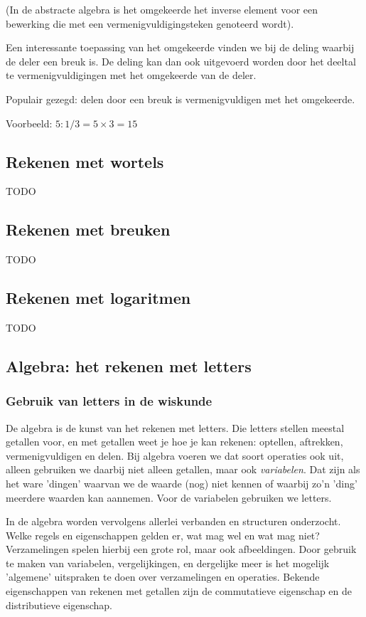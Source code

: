 \noindent (In de abstracte algebra is het omgekeerde het inverse element
voor een bewerking die met een vermenigvuldigingsteken genoteerd wordt).

\medskip{}


\noindent Een interessante toepassing van het omgekeerde vinden we
bij de deling waarbij de deler een breuk is. De deling kan dan ook
uitgevoerd worden door het deeltal te vermenigvuldigingen met het
omgekeerde van de deler. 

\noindent Populair gezegd: delen door een breuk is vermenigvuldigen
met het omgekeerde.

\noindent Voorbeeld: $5:1/3=5\times3=15$ 


\subsection{Rekenen met wortels}
TODO


\subsection{Rekenen met breuken}
TODO

\subsection{Rekenen met logaritmen}
TODO

\subsection{Algebra: het rekenen met letters}


\subsubsection{Gebruik van letters in de wiskunde}

De algebra is de kunst van het rekenen met letters. Die letters stellen
meestal getallen voor, en met getallen weet je hoe je kan rekenen:
optellen, aftrekken, vermenigvuldigen en delen. Bij algebra voeren
we dat soort operaties ook uit, alleen gebruiken we daarbij niet alleen
getallen, maar ook \emph{variabelen}. Dat zijn als het ware 'dingen'
waarvan we de waarde (nog) niet kennen of waarbij zo'n 'ding' meerdere
waarden kan aannemen. Voor de variabelen gebruiken we letters.

\noindent In de algebra worden vervolgens allerlei verbanden en structuren
onderzocht. Welke regels en eigenschappen gelden er, wat mag wel en
wat mag niet? Verzamelingen spelen hierbij een grote rol, maar ook
afbeeldingen. Door gebruik te maken van variabelen, vergelijkingen,
en dergelijke meer is het mogelijk 'algemene' uitspraken te doen over
verzamelingen en operaties. Bekende eigenschappen van rekenen met
getallen zijn de commutatieve eigenschap en de distributieve eigenschap.

